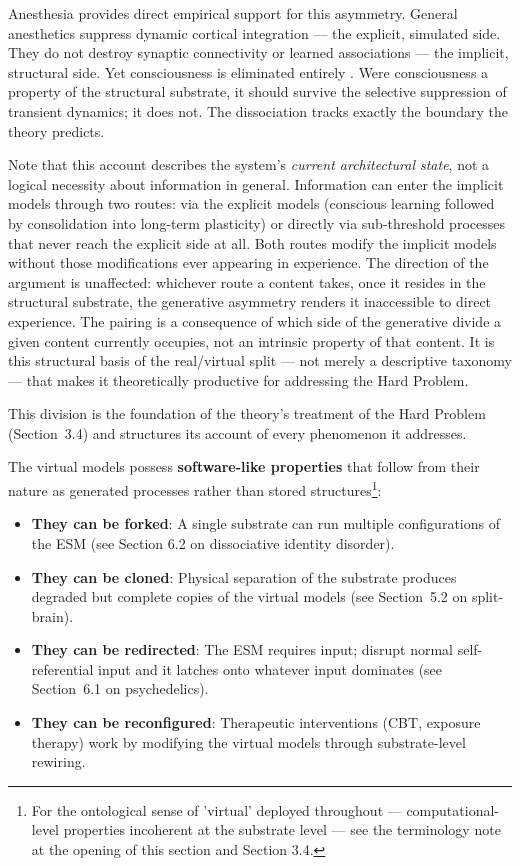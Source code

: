\documentclass[12pt]{article}
\begin{document}
Anesthesia provides direct empirical support for this asymmetry. General anesthetics suppress dynamic cortical integration --- the explicit, simulated side. They do not destroy synaptic connectivity or learned associations --- the implicit, structural side. Yet consciousness is eliminated entirely \citep{AlkireHudetzTononi2008}. Were consciousness a property of the structural substrate, it should survive the selective suppression of transient dynamics; it does not. The dissociation tracks exactly the boundary the theory predicts.

Note that this account describes the system's \emph{current architectural state}, not a logical necessity about information in general. Information can enter the implicit models through two routes: via the explicit models (conscious learning followed by consolidation into long-term plasticity) or directly via sub-threshold processes that never reach the explicit side at all. Both routes modify the implicit models without those modifications ever appearing in experience. The direction of the argument is unaffected: whichever route a content takes, once it resides in the structural substrate, the generative asymmetry renders it inaccessible to direct experience. The pairing is a consequence of which side of the generative divide a given content currently occupies, not an intrinsic property of that content. It is this structural basis of the real/virtual split --- not merely a descriptive taxonomy --- that makes it theoretically productive for addressing the Hard Problem.

This division is the foundation of the theory's treatment of the Hard Problem (Section~3.4) and structures its account of every phenomenon it addresses.

The virtual models possess \textbf{software-like properties} that follow from their nature as generated processes rather than stored structures\footnote{For the ontological sense of 'virtual' deployed throughout --- computational-level properties incoherent at the substrate level --- see the terminology note at the opening of this section and Section 3.4.}:

\begin{itemize}
\item \textbf{They can be forked}: A single substrate can run multiple configurations of the ESM (see Section 6.2 on dissociative identity disorder).
\item \textbf{They can be cloned}: Physical separation of the substrate produces degraded but complete copies of the virtual models (see Section~5.2 on split-brain).
\item \textbf{They can be redirected}: The ESM requires input; disrupt normal self-referential input and it latches onto whatever input dominates (see Section~6.1 on psychedelics).
\item \textbf{They can be reconfigured}: Therapeutic interventions (CBT, exposure therapy) work by modifying the virtual models through substrate-level rewiring.
\end{itemize}
\end{document}
